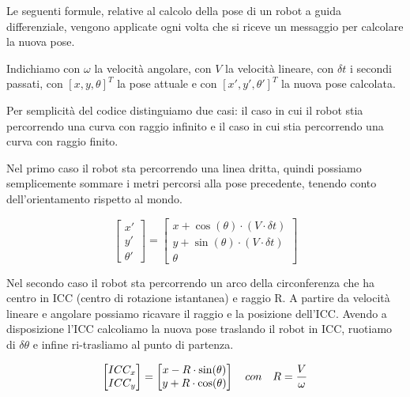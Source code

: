Le seguenti formule, relative al calcolo della pose di un robot a guida differenziale, vengono applicate ogni volta che si riceve un messaggio per calcolare la nuova pose.

Indichiamo con $\omega$ la velocità angolare, con $V$ la velocità lineare, con $\delta t$ i secondi passati, con $[x,y,\theta]^T$ la pose attuale e con $[x',y',\theta']^T$ la nuova pose calcolata.

Per semplicità del codice distinguiamo due casi: il caso in cui il robot stia percorrendo una curva con raggio infinito e il caso in cui stia percorrendo una curva con raggio finito.

Nel primo caso il robot sta percorrendo una linea dritta, quindi possiamo semplicemente sommare i metri percorsi alla pose precedente, tenendo conto dell'orientamento rispetto al mondo.

\begin{displaymath}
    \begin{bmatrix} x' \\ y' \\ \theta'  \end{bmatrix}
    =
    \begin{bmatrix} 
        x+\cos(\theta)\cdot(V\cdot\delta t) \\ 
        y+\sin(\theta)\cdot(V\cdot\delta t) \\ 
        \theta  
    \end{bmatrix}
\end{displaymath}

Nel secondo caso il robot sta percorrendo un arco della circonferenza che ha centro in ICC (centro di rotazione istantanea) e raggio R. A partire da velocità lineare e angolare possiamo ricavare il raggio e la posizione dell'ICC. Avendo a disposizione l'ICC calcoliamo la nuova pose traslando il robot in ICC, ruotiamo di $\delta \theta$ e infine ri-trasliamo al punto di partenza.

\begin{displaymath}
    \begin{bmatrix}
        ICC_x \\
        ICC_y \\
    \end{bmatrix}
    =
    \begin{bmatrix}
        x - R \cdot \sin(\theta) \\
        y + R \cdot \cos(\theta) \\
    \end{bmatrix} \\
    \quad con \quad
    R = \frac{V}{\omega}
\end{displaymath}

